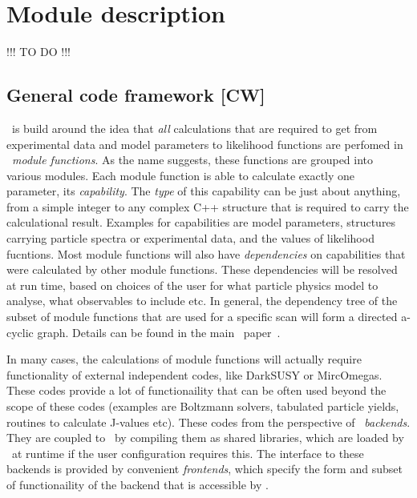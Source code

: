 \section{Module description}
\label{code}
\smallskip
{\color{red} !!! TO DO !!!}
\smallskip



\subsection{General code framework {\bf [CW]}}
\label{code_gen}

\GB\ is build around the idea that \emph{all} calculations that are required to
get from experimental data and model parameters to likelihood functions are
perfomed in \GB\ \emph{module functions}.  As the name suggests, these
functions are grouped into various modules.  Each module function is able to
calculate exactly one parameter, its \emph{capability}.  The \emph{type} of
this capability can be just about anything, from a simple integer to any
complex C++ structure that is required to carry the calculational result.
Examples for capabilities are model parameters, structures carrying particle
spectra or experimental data, and the values of likelihood fucntions.  Most
module functions will also have \emph{dependencies} on capabilities that were
calculated by other module functions.  These dependencies will be resolved at
run time, based on choices of the user for what particle physics model to
analyse, what observables to include etc.  In general, the dependency tree of
the subset of module functions that are used for a specific scan will form a
directed a-cyclic graph.  Details can be found in the main \GB\
paper~\cite{123}.

In many cases, the calculations of module functions will actually require
functionality of external independent codes, like DarkSUSY or MircOmegas.
These codes provide a lot of functionaility that can be often used beyond the
scope of these codes (examples are Boltzmann solvers, tabulated particle
yields, routines to calculate J-values etc).  These codes from the perspective
of \GB\ \emph{backends}.  They are coupled to \GB\ by compiling them as shared
libraries, which are loaded by \GB\ at runtime if the user configuration
requires this.  The interface to these backends is provided by convenient
\emph{frontends}, which specify the form and subset of functionaility of the
backend that is accessible by \GB.

